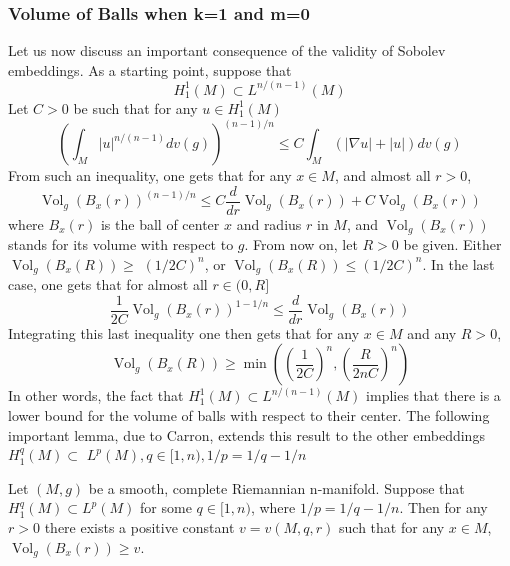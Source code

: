\documentclass[12pt,hyperref,a4paper,UTF8]{ctexart}
\begin{document}
\subsubsection{Volume of Balls when k=1 and m=0}
Let us now discuss an important consequence of the validity of Sobolev embeddings. As a starting point, suppose that
$$
H_1^{1}(M) \subset L^{n /(n-1)}(M)
$$
Let $C>0$ be such that for any $u \in H_1^{1}(M)$
$$
\left(\int_M|u|^{n /(n-1)} d v(g)\right)^{(n-1) / n} \leq C \int_M(|\nabla u|+|u|) d v(g)
$$
From such an inequality, one gets that for any $x \in M$, and almost all $r>0$,
$$
\operatorname{Vol}_g\left(B_x(r)\right)^{(n-1) / n} \leq C \frac{d}{d r} \operatorname{Vol}_g\left(B_x(r)\right)+C \operatorname{Vol}_g\left(B_x(r)\right)
$$
where $B_x(r)$ is the ball of center $x$ and radius $r$ in $M$, and $\operatorname{Vol}_g\left(B_x(r)\right)$ stands for its volume with respect to $g$. From now on, let $R>0$ be given. Either $\operatorname{Vol}_g\left(B_x(R)\right) \geq$ $(1 / 2 C)^n$, or $\operatorname{Vol}_g\left(B_x(R)\right) \leq(1 / 2 C)^n$. In the last case, one gets that for almost all $r \in(0, R]$
$$
\frac{1}{2 C} \operatorname{Vol}_g\left(B_x(r)\right)^{1-1 / n} \leq \frac{d}{d r} \operatorname{Vol}_g\left(B_x(r)\right)
$$
Integrating this last inequality one then gets that for any $x \in M$ and any $R>0$,
$$
\operatorname{Vol}_g\left(B_x(R)\right) \geq \min \left(\left(\frac{1}{2 C}\right)^n,\left(\frac{R}{2 n C}\right)^n\right)
$$
In other words, the fact that $H_1^{1}(M) \subset L^{n /(n-1)}(M)$ implies that there is a lower bound for the volume of balls with respect to their center. The following important lemma, due to Carron\cite{Carron}, extends this result to the other embeddings $H_1^q(M) \subset$ $L^p(M), q \in[1, n), 1 / p=1 / q-1 / n$

\begin{Lemma}
    Let $(M, g)$ be a smooth, complete Riemannian n-manifold. Suppose that $H_1^q(M) \subset L^p(M)$ for some $q \in[1, n)$, where $1 / p=1 / q-1 / n$. Then for any $r>0$ there exists a positive constant $v=v(M, q, r)$ such that for any $x \in M$, $\operatorname{Vol}_g\left(B_x(r)\right) \geq v$.
\label{lem32}
\end{Lemma}
\end{document}
